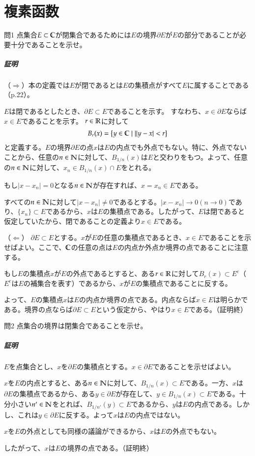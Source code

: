 \chapter{複素函数}%

\begin{mysimplebox}{問1}
    点集合$E\subset\mathbb{C}$が閉集合であるためには$E$の境界$\partial E$が$E$の部分であることが必要十分であることを示せ。 
\end{mysimplebox}
\paragraph{証明}
（$\Rightarrow$）本の定義では$E$が閉であるとは$E$の集積点がすべて$E$に属することである（p.22）。

$E$は閉であるとしたとき、$\partial E\subset E$であることを示す。
すなわち、$x\in\partial E$ならば$x\in E$であることを示す。
$r\in\mathbb{R}$に対して
\begin{align*}
    B_r(x)=\left\{y\in\mathbb{C}\mid\|y-x|<r\right\}
\end{align*}
と定義する。$E$の境界$\partial E$の点$x$は$E$の内点でも外点でもない。特に、外点でないことから、任意の$n\in \mathbb{N}$に対して、$B_{1/n}(x)$は$E$と交わりをもつ。よって、任意の$n\in \mathbb{N}$に対して、$x_n\in B_{1/n}(x)\cap E$をとれる。

もし$|x-x_n|=0$となる$n\in\mathbb{N}$が存在すれば、$x=x_n\in E$である。

すべての$n\in\mathbb{N}$に対して$|x-x_n|\neq 0$であるとする。$|x-x_n|\longrightarrow 0 (n\longrightarrow 0)$であり、$\{x_n\}\subset E$であるから、$x$は$E$の集積点である。したがって、$E$は閉であると仮定していたから、閉であることの定義より$x\in E$である。

（$\Leftarrow$）
$\partial E\subset E$とする。$x$が$E$の任意の集積点であるとき、$x\in E$であることを示せばよい。ここで、$\mathbb{C}$の任意の点は$E$の内点か外点か境界の点であることに注意する。

もし$E$の集積点$x$が$E$の外点であるとすると、ある$r\in\mathbb{R}$に対して$B_r(x)\subset E^c$（$E^c$は$E$の補集合を表す）であるから、$x$が$E$の集積点であることに反する。

よって、$E$の集積点$x$は$E$の内点か境界の点である。内点ならば$x\in E$は明らかである。境界の点ならば$\partial E\subset E$という仮定から、やはり$x\in E$である。（証明終）

\begin{mysimplebox}{問2}
    点集合の境界は閉集合であることを示せ。 
\end{mysimplebox}
\paragraph{証明}
$E$を点集合とし、$x$を$\partial E$の集積点とする。$x\in\partial E$であることを示せばよい。

$x$を$E$の内点とすると、ある$n\in\mathbb{N}$に対して、$B_{1/n}(x)\subset E$である。一方、$x$は$\partial E$の集積点であるから、ある$y\in\partial E$が存在して、$y\in B_{1/n}(x)\subset E$である。十分小さい$n'\in\mathbb{N}$をとれば、$B_{1/n'}(y)\subset E$であるから、$y$は$E$の内点である。しかし、これは$y\in\partial E$に反する。よって$x$は$E$の内点ではない。

$x$を$E$の外点としても同様の議論ができるから、$x$は$E$の外点でもない。

したがって、$x$は$E$の境界の点である。（証明終）